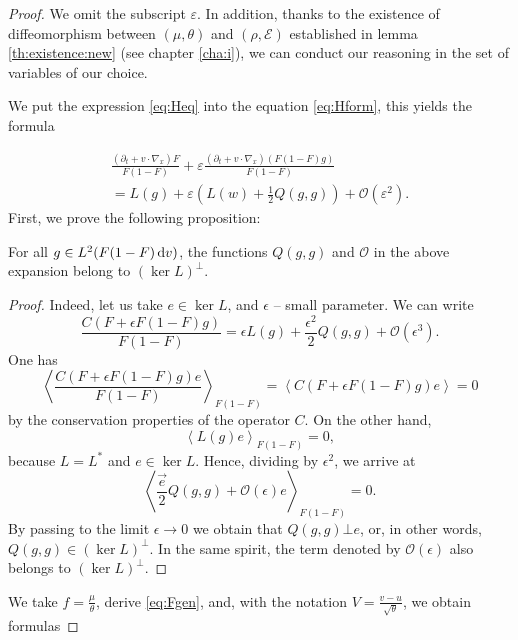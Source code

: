 \begin{proof}
We omit the subscript $\varepsilon$. In addition, thanks to the existence of diffeomorphism between $(\mu,\theta)$ and $(\rho,\mathcal E)$  established in lemma \ref{th:existence:new} (see chapter \ref{cha:i}), we can conduct our reasoning in the set of variables of our choice.



We put the expression \eqref{eq:Heq} into the equation \eqref{eq:Hform}, this yields the formula

\begin{equation}\label{eq:twoseries}
\begin{split}
 \frac{(\partial_t   + v\cdot \nabla_x)F}{F(1-F)}+\varepsilon\frac{(\partial_t   
+ v\cdot \nabla_x)(F(1-F)g)}{F(1-F)}\\=L(g)+\varepsilon\left(L(w)+\frac 12 
Q(g,g)\right)+\mathcal O(\varepsilon^2).\end{split}
\end{equation}
First, we prove the following proposition:
\begin{proposition}\label{pr:expansion}
For all $g\in L^2(F(1-F){\,\mathrm{d} v})$, the functions $Q(g,g)$ and $\mathcal O$ in the above expansion belong to $(\ker L)^\bot$.  
\end{proposition}\begin{proof}
	Indeed, let us take $ e\in \ker L$, and $\epsilon$ -- small parameter. We can write 
\[\frac{C(F+\epsilon F(1-F)g)}{F(1-F)}= \epsilon L(g)+\frac{\epsilon^2}{2}Q(g,g)+\mathcal O(\epsilon^3).\]
One has 
\[\left\langle \frac{C(F+\epsilon F(1-F)g)  e}{F(1-F)}\right\rangle_{F(1-F)}=\left\langle  C(F+\epsilon F(1-F)g)  e  \right\rangle =0\]
by the conservation properties of the operator $C$. On the other hand, 
\[\left\langle   L(g)  e  \right\rangle_{F(1-F)}=0, \]
because $L=L^\ast$ and $  e\in\ker L$.
Hence,   dividing by $\epsilon^2$, we arrive at
\[\left\langle  \frac{\vec e}{2}Q(g,g)+\mathcal O(\epsilon)   e  \right\rangle_{F(1-F)}=0.\]
By passing to the limit $\epsilon\to 0$ we obtain that $Q(g,g)\bot e$, or, in other words, $Q(g,g)\in(\ker L)^\bot$.
In the same spirit, the term denoted by $\mathcal O(\epsilon)$ also belongs to $(\ker L)^\bot$.
\end{proof}

 We take $f=\frac{\mu}{\theta}$, derive \eqref{eq:Fgen}, and, with the notation $V=\frac{v-u}{\sqrt\theta}$, we obtain  formulas
 

\end{proof}

